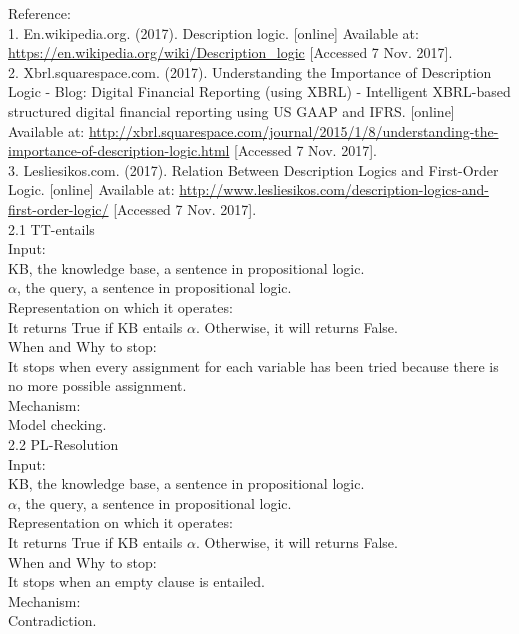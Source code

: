 \documentclass[a4paper]{article}
\begin{document}
Reference:\\
1. En.wikipedia.org. (2017). Description logic. [online] Available at: \url{https://en.wikipedia.org/wiki/Description_logic} [Accessed 7 Nov. 2017].\\
2. Xbrl.squarespace.com. (2017). Understanding the Importance of Description Logic - Blog: Digital Financial Reporting (using XBRL) - Intelligent XBRL-based structured digital financial reporting using US GAAP and IFRS. [online] Available at: \url{http://xbrl.squarespace.com/journal/2015/1/8/understanding-the-importance-of-description-logic.html} [Accessed 7 Nov. 2017].\\
3. Lesliesikos.com. (2017). Relation Between Description Logics and First-Order Logic. [online] Available at: \url{http://www.lesliesikos.com/description-logics-and-first-order-logic/} [Accessed 7 Nov. 2017].\\

2.1 TT-entails \\
Input:\\
KB, the knowledge base, a sentence in propositional logic.\\
$\alpha$, the query, a sentence in propositional logic.\\
Representation on which it operates:\\
It returns True if KB entails $\alpha$. Otherwise, it will returns False.\\
When and Why to stop:\\
It stops when every assignment for each variable has been tried because there is no more possible assignment.\\
Mechanism:\\
Model checking.\\


2.2 PL-Resolution \\
Input:\\
KB, the knowledge base, a sentence in propositional logic.\\
$\alpha$, the query, a sentence in propositional logic.\\
Representation on which it operates:\\
It returns True if KB entails $\alpha$. Otherwise, it will returns False.\\
When and Why to stop:\\
It stops when an empty clause is entailed.\\
Mechanism:\\
Contradiction.\\
\end{document}
